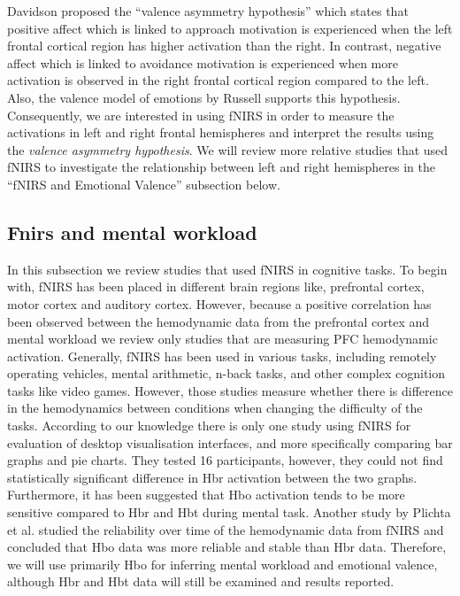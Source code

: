 \documentclass[a4paper]{report}
\begin{document}
		Davidson proposed the ``valence asymmetry hypothesis'' which states that positive affect which is linked to approach motivation is experienced when the left frontal cortical region has higher activation than the right. In contrast, negative affect which is linked to avoidance motivation is experienced when more activation is observed in the right frontal cortical region compared to the left. Also, the valence model of emotions by Russell\cite{russell2003core} supports this hypothesis. Consequently, we are interested in using fNIRS in order to measure the activations in left and right frontal hemispheres and interpret the results using the \textit{valence asymmetry hypothesis}. We will review more relative studies that used fNIRS to investigate the relationship between left and right hemispheres in the ``fNIRS and Emotional Valence'' subsection below. 
		
		\subsection{Fnirs and mental workload}
			In this subsection we review studies that used fNIRS in cognitive tasks. To begin with, fNIRS has been placed in different brain regions like, prefrontal cortex\cite{ayaz2012optical}, motor cortex\cite{hirth1996non} and auditory cortex\cite{plichta2011auditory}. However, because a positive correlation has been observed between the hemodynamic data from the prefrontal cortex and mental workload\cite{parasuraman2005neural} we review only studies that are measuring PFC hemodynamic activation. 
			Generally, fNIRS has been used in various tasks, including remotely operating vehicles\cite{durantin2014using,ayaz2012optical}, mental arithmetic\cite{pike2014measuring}, n-back tasks\cite{durantin2014using,ayaz2012optical}, and other complex cognition tasks like video games\cite{izzetoglu2004functional,bunce2011implementation,ayaz2012optical}. However, those studies measure whether there is difference in the hemodynamics between conditions when changing the difficulty of the tasks. According to our knowledge there is only one study using fNIRS for evaluation of desktop visualisation interfaces, and more specifically comparing bar graphs and pie charts\cite{peck2013using}. They tested 16 participants, however, they could not find statistically significant difference in Hbr activation between the two graphs.
			Furthermore, it has been suggested that Hbo activation tends to be more sensitive compared to Hbr and Hbt during  mental task\cite{naseer2014online}. Another study by Plichta et al.\cite{plichta2006event} studied the reliability over time of the hemodynamic data from fNIRS and concluded that Hbo data was more reliable and stable than Hbr data. Therefore, we will use primarily Hbo for inferring mental workload and emotional valence, although Hbr and Hbt data will still be examined and results reported.
					
\end{document}
